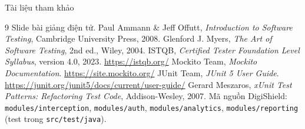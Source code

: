 \documentclass[aspectratio=169,12pt]{beamer}
\begin{document}
\begin{frame}{Tài liệu tham khảo}
  \vspace*{-0.4em}
  \footnotesize
  \begin{thebibliography}{9}
     Slide bài giảng điện tử.
     Paul Ammann \& Jeff Offutt, \textit{Introduction to
      Software Testing}, Cambridge University Press, 2008.
     Glenford J. Myers, \textit{The Art of Software Testing},
      2nd ed., Wiley, 2004.
     ISTQB, \textit{Certified Tester Foundation Level Syllabus},
      version 4.0, 2023. \url{https://istqb.org/}
     Mockito Team, \textit{Mockito Documentation}.
      \url{https://site.mockito.org/}
     JUnit Team, \textit{JUnit 5 User Guide}.
      \url{https://junit.org/junit5/docs/current/user-guide/}
     Gerard Meszaros, \textit{xUnit Test Patterns:
      Refactoring Test Code}, Addison-Wesley, 2007.
     Mã nguồn DigiShield: \texttt{modules/interception},
      \texttt{modules/auth}, \texttt{modules/analytics},
      \texttt{modules/reporting} (test trong \texttt{src/test/java}).
  \end{thebibliography}
\end{frame}
\end{document}

